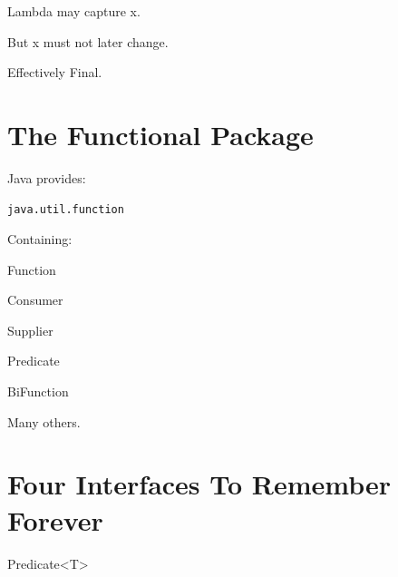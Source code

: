 \documentclass[11pt,a4paper]{book}
\begin{document}

Lambda may capture x.


But x must not later change.


Effectively Final.


\section{The Functional Package}

Java provides:

\begin{verbatim} 
java.util.function
\end{verbatim}


Containing:


Function


Consumer


Supplier


Predicate


BiFunction


Many others.


\section{Four Interfaces To Remember Forever}


Predicate<T>
\end{document}
